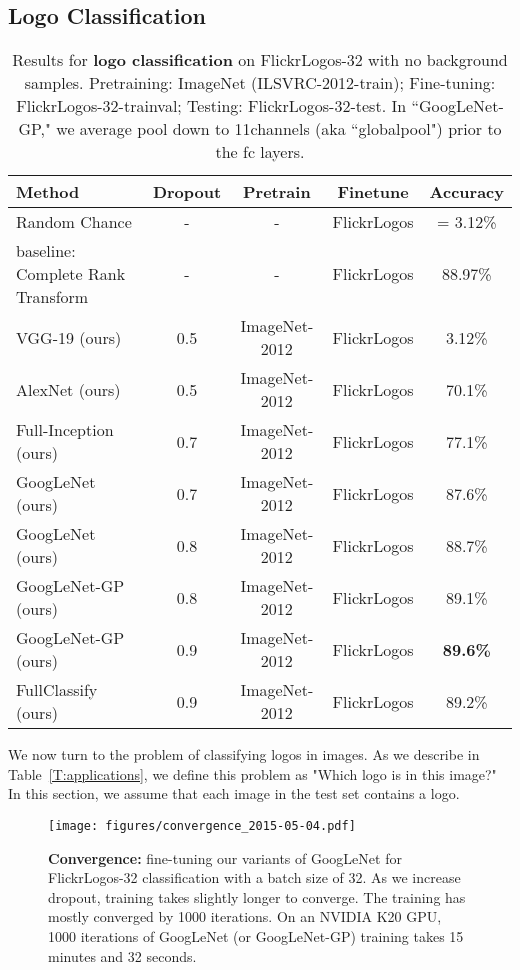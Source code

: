\documentclass{bmvc2k}
\begin{document}
\subsection{Logo Classification}
\vspace{-0.1in}
\label{sec:classification}


\begin{table}[htb]
\footnotesize
\caption{Results for {\bf logo classification} on FlickrLogos-32 with no background samples. Pretraining: ImageNet (ILSVRC-2012-train); Fine-tuning: FlickrLogos-32-trainval; Testing: FlickrLogos-32-test. In ``GoogLeNet-GP," we average pool down to 11channels (aka ``globalpool") prior to the fc layers.}
\label{T:logo-classification}
\centering
\begin{tabular}{|p{2.5cm}|c|c|c|c|}
\hline
Method & Dropout & Pretrain & Finetune & Accuracy\\ \hline
Random Chance & - & - & FlickrLogos &  = 3.12\% \\ \hline
baseline: Complete Rank Transform~\cite{Boia2014} & - & - & FlickrLogos & 88.97\% \\ \hline
VGG-19 (ours) & 0.5 & ImageNet-2012 & FlickrLogos & 3.12\% \\ \hline
AlexNet (ours) & 0.5 & ImageNet-2012 & FlickrLogos & 70.1\% \\ \hline
Full-Inception (ours) & 0.7 & ImageNet-2012 & FlickrLogos & 77.1\% \\ \hline GoogLeNet (ours) & 0.7 & ImageNet-2012 & FlickrLogos & 87.6\% \\ \hline
GoogLeNet (ours) & 0.8 & ImageNet-2012 & FlickrLogos & 88.7\% \\ \hline
GoogLeNet-GP (ours) & 0.8 & ImageNet-2012 & FlickrLogos & 89.1\% \\ \hline
GoogLeNet-GP (ours) & 0.9 & ImageNet-2012 & FlickrLogos & {\bf 89.6\%} \\ \hline
FullClassify (ours) & 0.9 & ImageNet-2012 & FlickrLogos & 89.2\% \\ \hline
\end{tabular}
\end{table}
We now turn to the problem of classifying logos in images.
As we describe in Table~\ref{T:applications}, we define this problem as "Which logo is in this image?"
In this section, we assume that each image in the test set contains a logo.

\begin{figure}[htb]
  \begin{center}
    \texttt{[image: figures/convergence\_2015-05-04.pdf]} 

  \end{center}
    \caption{{\bf Convergence:} fine-tuning our variants of GoogLeNet for FlickrLogos-32 classification with a batch size of 32. As we increase dropout, training takes slightly longer to converge. The training has mostly converged by 1000 iterations. On an NVIDIA K20 GPU, 1000 iterations of GoogLeNet (or GoogLeNet-GP) training takes 15 minutes and 32 seconds.}
    
   \label{fig:convergence}
\end{figure}
\end{document}
